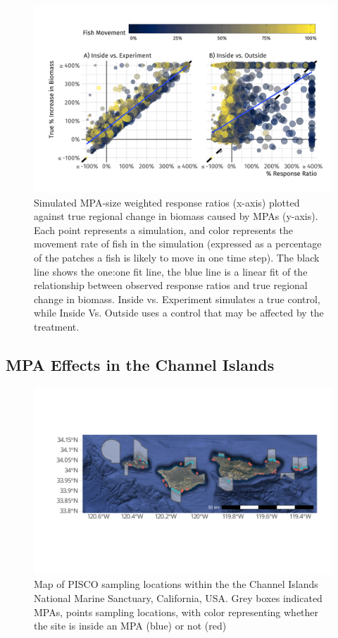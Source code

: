 \documentclass[9pt,twocolumn,twoside,lineno]{pnas-new}
\begin{document}
\begin{figure}%
  \centering
  \includegraphics[width=.9\linewidth]{figs/density-ratio.png}
  \caption{Simulated MPA-size weighted response ratios (x-axis) plotted against true regional change in biomass caused by MPAs (y-axis). Each point represents a simulation, and color represents the movement rate of fish in the simulation (expressed as a percentage of the patches a fish is likely to move in one time step). The black line shows the one:one fit line, the blue line is a linear fit of the relationship between observed response ratios and true regional change in biomass. Inside vs. Experiment simulates a true control, while Inside Vs. Outside uses a control that may be affected by the treatment.}
  \label{density-ratio}
\end{figure}

\hypertarget{estimating}{%
\subsection*{MPA Effects in the Channel Islands}\label{estimating}}

\begin{figure}%
  \centering
  \includegraphics[width=1\linewidth]{figs/channel-islands.pdf}
  \caption{Map of PISCO sampling locations within the the Channel Islands National Marine Sanctuary, California, USA. Grey boxes indicated MPAs, points sampling locations, with color representing whether the site is inside an MPA (blue) or not (red)}
  \label{channel-islands}
\end{figure}
\end{document}
